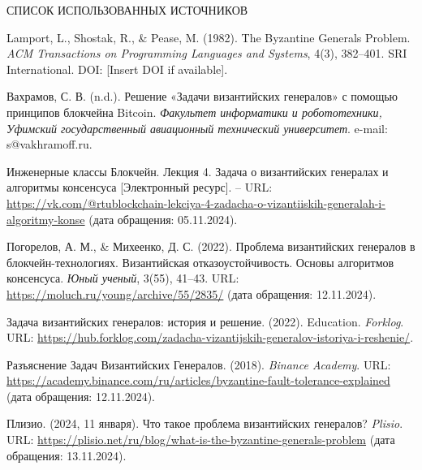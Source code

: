 \begin{center}
    \MakeUppercase{\large Список использованных источников}
\end{center}

\renewcommand{\refname}{}
\vspace{-11mm}

\makeatletter
\renewcommand\@biblabel[1]{#1.} %
\makeatother

\begin{thebibliography}{9}

Lamport, L., Shostak, R., \& Pease, M. (1982). The Byzantine Generals Problem. \textit{ACM Transactions on Programming Languages and Systems}, 4(3), 382–401. SRI International. DOI: [Insert DOI if available].

Вахрамов, С. В. (n.d.). Решение «Задачи византийских генералов» с помощью принципов блокчейна Bitcoin. \textit{Факультет информатики и робототехники, Уфимский государственный авиационный технический университет}. e-mail: s@vakhramoff.ru.

Инженерные классы Блокчейн. Лекция 4. Задача о византийских генералах и алгоритмы консенсуса [Электронный ресурс]. – URL: \url{https://vk.com/@rtublockchain-lekciya-4-zadacha-o-vizantiiskih-generalah-i-algoritmy-konse} (дата обращения: 05.11.2024).

Погорелов, А. М., \& Михеенко, Д. С. (2022). Проблема византийских генералов в блокчейн-технологиях. Византийская отказоустойчивость. Основы алгоритмов консенсуса. \textit{Юный ученый}, 3(55), 41–43. URL: \url{https://moluch.ru/young/archive/55/2835/} (дата обращения: 12.11.2024).

Задача византийских генералов: история и решение. (2022). Education. \textit{Forklog}. URL: \url{https://hub.forklog.com/zadacha-vizantijskih-generalov-istoriya-i-reshenie/}.

Разъяснение Задач Византийских Генералов. (2018). \textit{Binance Academy}. URL: \url{https://academy.binance.com/ru/articles/byzantine-fault-tolerance-explained} (дата обращения: 12.11.2024).

Плизио. (2024, 11 января). Что такое проблема византийских генералов? \textit{Plisio}. URL: \url{https://plisio.net/ru/blog/what-is-the-byzantine-generals-problem} (дата обращения: 13.11.2024).


\end{thebibliography}
